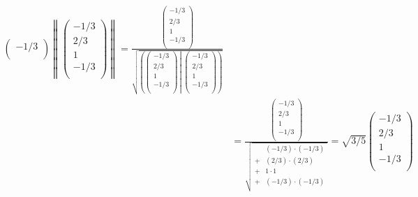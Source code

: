 \documentclass[dvipdfmx]{jsarticle}
\begin{document}
\begin{align*}
{\begin{pmatrix}
   - {1}/{3} \\
\end{pmatrix}}{\left\| \begin{pmatrix}
   - {1}/{3} \\
  {2}/{3} \\
  1 \\
   - {1}/{3} \\
\end{pmatrix} \right\|} = \frac{\begin{pmatrix}
   - {1}/{3} \\
  {2}/{3} \\
  1 \\
   - {1}/{3} \\
\end{pmatrix}}{\sqrt{\left( \begin{pmatrix}
   - {1}/{3} \\
  {2}/{3} \\
  1 \\
   - {1}/{3} \\
\end{pmatrix} \middle| \begin{pmatrix}
   - {1}/{3} \\
  {2}/{3} \\
  1 \\
   - {1}/{3} \\
\end{pmatrix} \right)}}\\
&= \frac{\begin{pmatrix}
   - {1}/{3} \\
  {2}/{3} \\
  1 \\
   - {1}/{3} \\
\end{pmatrix}}{\sqrt{\begin{matrix}
  \  & \left( - {1}/{3} \right) \cdot \left( - {1}/{3} \right) \\
   + & \left( {2}/{3} \right) \cdot \left( {2}/{3} \right) \\
   + & 1 \cdot 1 \\
   + & \left( - {1}/{3} \right) \cdot \left( - {1}/{3} \right) \\
\end{matrix}}} = \sqrt{{3}/{5}}\begin{pmatrix}
   - {1}/{3} \\
  {2}/{3} \\
  1 \\
   - {1}/{3} \\

\end{pmatrix}
\end{align*}
\end{document}
